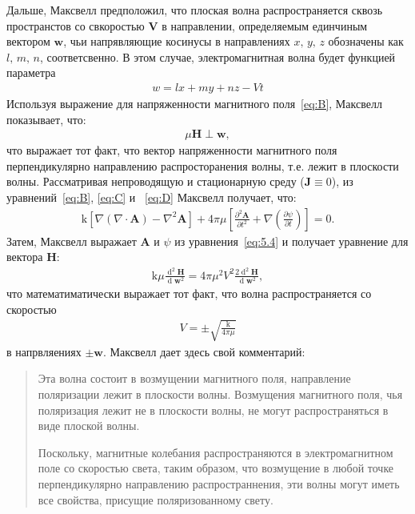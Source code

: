 \documentclass[12pt, oneside, a4paper]{article}
\begin{document}
Дальше, Максвелл предположил, что плоская волна распространяется сквозь пространстов со свкоростью $\mathbf{V}$ в направлении, определяемым единчиным вектором $\mathbf{w}$, чьи напрявляющие косинусы в направлениях $x,\,y,\,z$ обозначены как $l,\,m,\,n$, соответсвенно. В этом случае, электромагнитная волна будет функцией параметра
\begin{align*}
w=lx+my+nz-Vt
\end{align*}
Используя выражение для напряженности магнитного поля~\eqref{eq:B}, Максвелл показывает, что:
\begin{align*}
\mu\mathbf{H}\perp\mathbf{w},
\end{align*}
что выражает тот факт, что вектор напряженности магнитного поля перпендикулярно направлению распросторанения волны, т.е. лежит в плоскости волны. Рассматривая непроводящую и стационарную среду ($\mathbf{J}\equiv0$), из уравнений~\eqref{eq:B}, \eqref{eq:C} и ~\eqref{eq:D} Максвелл получает, что:
\begin{align}
\mathrm{k}\left[\nabla\left(\nabla\cdot\mathbf{A}\right)-\nabla^2\mathbf{A}\right]+4\pi\mu\left[\frac{\partial^2\mathbf{A}}{\partial{}t^2}+\nabla\left(\frac{\partial\psi}{\partial{}t}\right)\right]=0.\label{eq:5.4}
\end{align}
Затем, Максвелл выражает $\mathbf{A}$ и $\psi$ из уравнения~\eqref{eq:5.4} и получает уравнение для вектора $\mathbf{H}$:
\begin{align*}
\mathrm{k}\mu\frac{\operatorname{d}^2\mathbf{H}}{\operatorname{d}\mathbf{w}^2}=4\pi\mu^2V^2\frac{2\operatorname{d}^2\mathbf{H}}{\operatorname{d}\mathbf{w}^2},
\end{align*}
что математиматически выражает тот факт, что волна распространяется со скоростью\begin{align}
V=\pm\sqrt{\frac{\mathrm{k}}{4\pi\mu}}\label{eq:5.7}
\end{align} 
в напрвляениях $\pm\mathbf{w}$.
Максвелл дает здесь свой комментарий:
\begin{quotation}
\small
Эта волна состоит в возмущении магнитного поля, направление поляризации лежит в плоскости волны. Возмущения магнитного поля, чья поляризация лежит не в плоскости волны, не могут распространяться в виде плоской волны.

Поскольку, магнитные колебания распространяются в электромагнитном поле со скоростью света, таким образом, что возмущение в любой точке перпендикулярно направлению распространнения, эти волны могут иметь все свойства, присущие поляризованному свету.
\end{quotation}
\end{document}
